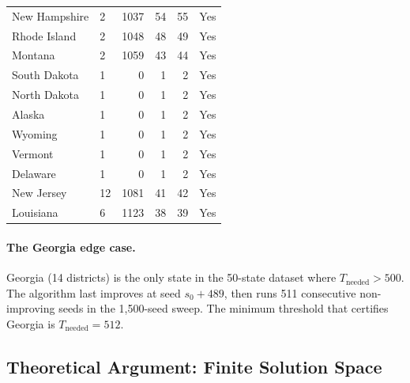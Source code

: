 \begin{longtable}{llrrrc}
New Hampshire           & 2  & 1037 &  54 &  55 & Yes \\
Rhode Island            & 2  & 1048 &  48 &  49 & Yes \\
Montana                 & 2  & 1059 &  43 &  44 & Yes \\
South Dakota            & 1  &    0 &   1 &   2 & Yes \\
North Dakota            & 1  &    0 &   1 &   2 & Yes \\
Alaska                  & 1  &    0 &   1 &   2 & Yes \\
Wyoming                 & 1  &    0 &   1 &   2 & Yes \\
Vermont                 & 1  &    0 &   1 &   2 & Yes \\
Delaware                & 1  &    0 &   1 &   2 & Yes \\
New Jersey              & 12 & 1081 &  41 &  42 & Yes \\
Louisiana               & 6  & 1123 &  38 &  39 & Yes \\
\end{longtable}


\paragraph{The Georgia edge case.}
Georgia (14 districts) is the only state in the 50-state dataset where
$T_{\mathrm{needed}} > 500$.
The algorithm last improves at seed $s_0 + 489$, then runs 511 consecutive
non-improving seeds in the 1{,}500-seed sweep.
The minimum threshold that certifies Georgia is $T_{\mathrm{needed}} = 512$.

\begin{center}
\setlength{\fboxsep}{8pt}
\end{center}

\subsection{Theoretical Argument: Finite Solution Space}

